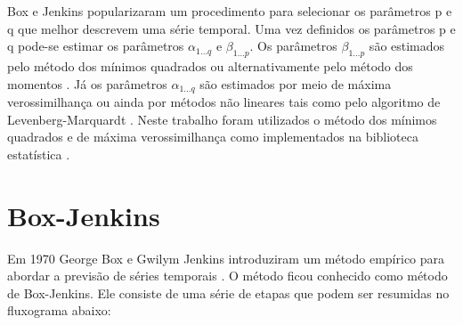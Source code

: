 \documentclass[
	12pt,				%
	openright,			%
	oneside,			%
	a4paper,			%
	english,			%
	french,				%
	spanish,			%
	brazil				%
	]{abntex2}
\begin{document}
Box e Jenkins popularizaram um procedimento para selecionar os parâmetros p e q que melhor descrevem uma série temporal. Uma vez definidos os parâmetros p e q pode-se estimar os parâmetros $\alpha_{1\dots q}$ e $\beta_{1\dots p}$. Os parâmetros $\beta_{1\dots p}$ são estimados pelo método dos mínimos quadrados ou alternativamente pelo  método dos momentos \cite{yulewalker}. Já os parâmetros $\alpha_{1\dots q}$ são estimados por meio de máxima verossimilhança \cite{boxjay} ou ainda por métodos não lineares tais como pelo algoritmo de Levenberg-Marquardt \cite{marq}. Neste trabalho foram utilizados o método dos mínimos quadrados e de máxima verossimilhança como implementados na biblioteca estatística \cite{Rugarch}.

\chapter{Box-Jenkins}

Em 1970 George Box e Gwilym Jenkins introduziram um método empírico para abordar a previsão de séries temporais \cite{boxjay}. O método ficou conhecido como método de Box-Jenkins. Ele consiste de uma série de etapas que podem ser resumidas no fluxograma abaixo:
\end{document}
